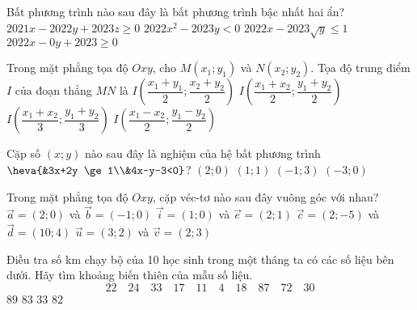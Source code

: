 \begin{ex}%
	Bất phương trình nào sau đây là bất phương trình bậc nhất hai ẩn?
	\choice
	{$2021x-2022y+2023z \ge 0$}
	{$2022x^2-2023y<0$}
	{$2022x-2023\sqrt{y} \le 1$}
	{\True $2022x-0y+2023 \ge 0$}
\end{ex}

\begin{ex}%
	Trong mặt phẳng tọa độ $Oxy$, cho $M(x_1;y_1)$ và $N(x_2;y_2)$. Tọa độ trung điểm $I$ của đoạn thẳng $MN$ là 
	\choice
	{$I\left(\dfrac{x_1+y_1}{2};\dfrac{x_2+y_2}{2}\right)$}
	{\True $I\left(\dfrac{x_1+x_2}{2};\dfrac{y_1+y_2}{2}\right)$}
	{$I\left(\dfrac{x_1+x_2}{3};\dfrac{y_1+y_2}{3}\right)$}
	{$I\left(\dfrac{x_1-x_2}{2};\dfrac{y_1-y_2}{2}\right)$}
\end{ex}

\begin{ex}%
	Cặp số $(x;y)$ nào sau đây là nghiệm của hệ bất phương trình $\heva{&3x+2y \ge 1\\&4x-y-3<0}$?
	\choice
	{$(2;0)$}
	{$(1;1)$}
	{\True $(-1;3)$}
	{$(-3;0)$}
\end{ex}

\begin{ex}%
	Trong mặt phẳng tọa độ $Oxy$, cặp véc-tơ nào sau đây vuông góc với nhau?
	\choice
	{$\vec{a}=(2;0)$ và $\vec{b}=(-1;0)$}
	{$\vec{i}=(1;0)$ và $\vec{e}=(2;1)$}
	{\True $\vec{c}=(2;-5)$ và $\vec{d}=(10;4)$}
	{$\vec{u}=(3;2)$ và $\vec{v}=(2;3)$}
\end{ex}

\begin{ex}%
	Điều tra số km chạy bộ của 10 học sinh trong một tháng ta có các số liệu bên dưới. Hãy tìm khoảng biến thiên của mẫu số liệu.
	\[22 \quad 24 \quad 33 \quad 17 \quad 11 \quad 4 \quad 18 \quad 87 \quad 72 \quad 30\]
	\choice
	{$89$}
	{\True $83$}
	{$33$}
	{$82$}
\end{ex}

